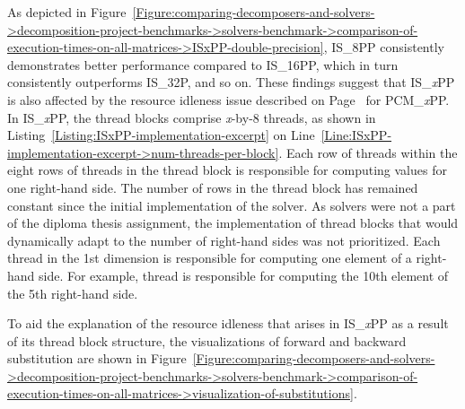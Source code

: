 As depicted in Figure~\ref{Figure:comparing-decomposers-and-solvers->decomposition-project-benchmarks->solvers-benchmark->comparison-of-execution-times-on-all-matrices->ISxPP-double-precision}, IS\_8PP consistently demonstrates better performance compared to IS\_16PP, which in turn consistently outperforms IS\_32P, and so on.
These findings suggest that IS\_\textit{x}PP is also affected by the resource idleness issue described on Page~\pageref{Paragraph:comparing-decomposers-and-solvers->decomposition-project-benchmarks->decomposers-benchmark->comparison-of-execution-times-on-subset-of-matrices->PCMxPP} for PCM\_\textit{x}PP.
In IS\_\textit{x}PP, the thread blocks comprise \textit{x}-by-8 threads, as shown in Listing~\ref{Listing:ISxPP-implementation-excerpt} on Line~\ref{Line:ISxPP-implementation-excerpt->num-threads-per-block}.
Each row of threads within the eight rows of threads in the thread block is responsible for computing values for one right-hand side.
The number of rows in the thread block has remained constant since the initial implementation of the solver.
As solvers were not a part of the diploma thesis assignment, the implementation of thread blocks that would dynamically adapt to the number of right-hand sides was not prioritized.
Each thread in the 1st dimension is responsible for computing one element of a right-hand side.
For example, thread  is responsible for computing the 10th element of the 5th right-hand side.

To aid the explanation of the resource idleness that arises in IS\_\textit{x}PP as a result of its thread block structure, the visualizations of forward and backward substitution are shown in Figure~\ref{Figure:comparing-decomposers-and-solvers->decomposition-project-benchmarks->solvers-benchmark->comparison-of-execution-times-on-all-matrices->visualization-of-substitutions}.

